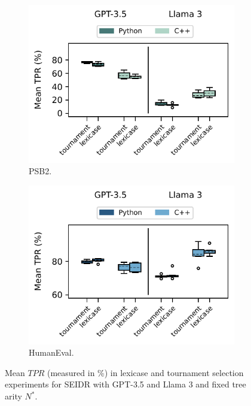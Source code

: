 \begin{figure}
\begin{subfigure}{.45\linewidth}
\centering
\includegraphics[width=\linewidth, trim={0mm 4mm 0mm 0mm}]{images/mean_tpr_lexicase_psb2_6runs_boxplot_v5.pdf}
  \caption{PSB2.}
  \label{fig:mean-tpr-lexicase-selection-psb2}
\end{subfigure}
\begin{subfigure}{.45\linewidth}
\centering
\includegraphics[width=\linewidth, trim={0mm 4mm 0mm 0mm}]{images/mean_tpr_lexicase_humaneval_6runs_boxplot_v5.pdf}
  \caption{HumanEval.}
  \label{fig:mean-tpr-lexicase-selection-he}
\end{subfigure}
\caption{Mean $TPR$ (measured in \%) in lexicase and tournament selection experiments for SEIDR with GPT-3.5 and Llama 3 and fixed tree arity $N^*.$}
\label{fig:mean-tpr-lexicase-selection}
\end{figure}

